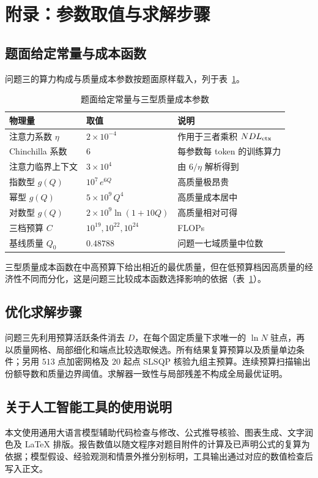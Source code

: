 \appendix
\section{附录：参数取值与求解步骤}

\subsection{题面给定常量与成本函数}
问题三的算力构成与质量成本参数按题面原样载入，列于表~\ref{tab:appendix-params}。

\begin{table}[!htbp]
  \centering
  \songti{}
  \caption{题面给定常量与三型质量成本参数}
  \label{tab:appendix-params}
  \begin{tabular}{lll}
    \toprule
    物理量 & 取值 & 说明 \\
    \midrule
    注意力系数 $\eta$ & $2\times10^{-4}$ & 作用于三者乘积 $NDL_{\mathrm{ctx}}$ \\
    Chinchilla 系数 & $6$ & 每参数每 token 的训练算力 \\
    注意力临界上下文 & $3\times10^{4}$ & 由 $6/\eta$ 解析得到 \\
    指数型 $g(Q)$ & $10^{7}\,e^{6Q}$ & 高质量极昂贵 \\
    幂型 $g(Q)$ & $5\times10^{9}\,Q^{4}$ & 高质量成本居中 \\
    对数型 $g(Q)$ & $2\times10^{9}\ln(1+10Q)$ & 高质量相对可得 \\
    三档预算 $C$ & $10^{19},10^{22},10^{24}$ & FLOPs \\
    基线质量 $Q_0$ & $0.48788$ & 问题一七域质量中位数 \\
    \bottomrule
  \end{tabular}
\end{table}

三型质量成本函数在中高预算下给出相近的最优质量，但在低预算档因高质量的经济性不同而分化，这是问题三比较成本函数选择影响的依据（表~\ref{tab:appendix-params}）。

\subsection{优化求解步骤}
问题三先利用预算活跃条件消去 $D$，在每个固定质量下求唯一的 $\ln N$ 驻点，再以质量网格、局部细化和端点比较选取候选。所有结果复算预算以及质量单边条件；另用 $513$ 点加密网格及 $20$ 起点 SLSQP 核验九组主预算。连续预算扫描输出份额导数和质量边界阈值。求解器一致性与局部残差不构成全局最优证明。

\subsection{关于人工智能工具的使用说明}
本文使用通用大语言模型辅助代码检查与修改、公式推导核验、图表生成、文字润色及 LaTeX 排版。报告数值以随文程序对题目附件的计算及已声明公式的复算为依据；模型假设、经验观测和情景外推分别标明，工具输出通过对应的数值检查后写入正文。
